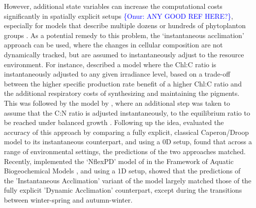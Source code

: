 \documentclass[gmd, manuscript]{copernicus}
\newcommand{\onur}[1]{\textcolor{blue}{\{Onur: #1\}}}
\begin{document}
However, additional state variables can increase the computational costs significantly in spatially explicit setups \onur{ANY GOOD REF HERE?}, especially for models that describe multiple dozens or hundreds of phytoplanton groups \citep[e.g.][]{Dutkiewicz2020}. As a potential remedy to this problem, the `instantaneous acclimation' approach can be used, where the changes in cellular composition are not dynamically tracked, but are assumed to instantaneously adjust to the resource environment. For instance, \citet{Pahlowetal13} described a model where the Chl:C ratio is instantaneously adjusted to any given irradiance level, based on a trade-off between the higher specific production rate benefit of a higher Chl:C ratio and the additional respiratory costs of synthesizing and maintaining the pigments. This was followed by the model by \citet{Smith2016}, where an additional step was taken to assume that the C:N ratio is adjusted instantaneously, to the equilibrium ratio to be reached under balanced growth \citep{Burmaster1979}. Following up the idea, \citet{Ward2017} evaluated the accuracy of this approach by comparing a fully explicit, classical Caperon/Droop model \citep{Caperon1968,Droop1968} to its instantaneous counterpart, and using a 0D setup, found that across a range of environmental settings, the predictions of the two approaches matched. Recently, \citet{Kerimoglu2021} implemented the `NflexPD' model of \citet{Smith2016} in the Framework of Aquatic Biogeochemical Models \citep[FABM,][]{Bruggeman2014}, and using a 1D setup, showed that the predictions of the 'Instantaneous Acclimation' variant of the model largely matched those of the fully explicit 'Dynamic Acclimation' counterpart, except during the transitions between winter-spring and autumn-winter.
\end{document}

